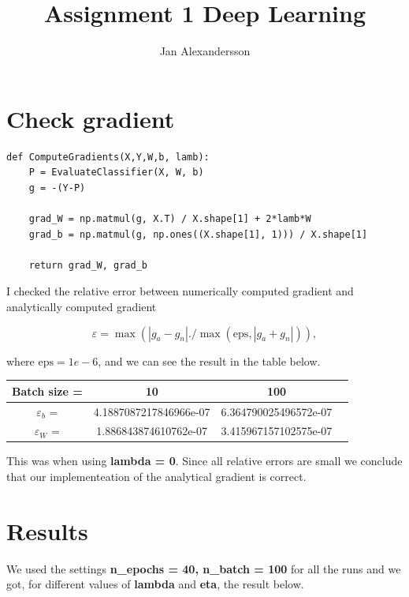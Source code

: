 \documentclass{article}
\begin{document}
\title{Assignment 1 Deep Learning}
\author{Jan Alexandersson}
\maketitle 


\section{Check gradient}

\begin{lstlisting}
def ComputeGradients(X,Y,W,b, lamb):	
	P = EvaluateClassifier(X, W, b)
	g = -(Y-P)
	
	grad_W = np.matmul(g, X.T) / X.shape[1] + 2*lamb*W
	grad_b = np.matmul(g, np.ones((X.shape[1], 1))) / X.shape[1]
	
	return grad_W, grad_b
\end{lstlisting}


I checked the relative error between numerically computed gradient and analytically computed gradient 

\begin{equation}
 \varepsilon = \max (|g_a - g_n| ./ \max(\text{eps} , |g_a + g_n|)),
\end{equation}

where $\text{eps} = 1e-6$, and we can see the result in the table below. 

\begin{center}
\begin{tabular}{ |c|c|c|c| } 
\hline
Batch size = & 10 & 100 \\
\hline
$\varepsilon_b$ = & 4.1887087217846966e-07 & 6.364790025496572e-07  \\
\hline
$\varepsilon_W$ = & 1.886843874610762e-07 &  3.415967157102575e-07 \\ 
\hline
\end{tabular}
\end{center}

This was when using \textbf{lambda = 0}. Since all relative errors are small we conclude that our implementeation of the 
analytical gradient is correct. 

\section{Results}

We used the settings \textbf{n\_epochs = 40, n\_batch = 100} for all the runs and we got, for different values of 
\textbf{lambda} and \textbf{eta}, the result below. 
\end{document}
